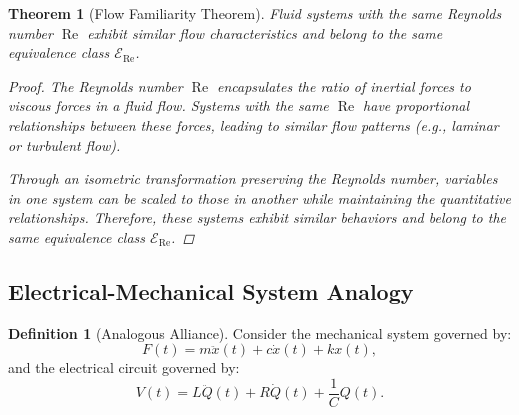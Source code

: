 \documentclass{article}
\newtheorem{theorem}{Theorem}[section]
\theoremstyle{definition}
\newtheorem{definition}{Definition}[section]
\theoremstyle{remark}
\begin{document}
	\begin{theorem}[Flow Familiarity Theorem]
		Fluid systems with the same Reynolds number $\operatorname{Re}$ exhibit similar flow characteristics and belong to the same equivalence class $\mathcal{E}_{\operatorname{Re}}$.
		
		\begin{proof}
			The Reynolds number $\operatorname{Re}$ encapsulates the ratio of inertial forces to viscous forces in a fluid flow. Systems with the same $\operatorname{Re}$ have proportional relationships between these forces, leading to similar flow patterns (e.g., laminar or turbulent flow).
			
			Through an isometric transformation preserving the Reynolds number, variables in one system can be scaled to those in another while maintaining the quantitative relationships. Therefore, these systems exhibit similar behaviors and belong to the same equivalence class $\mathcal{E}_{\operatorname{Re}}$.
		\end{proof}
	\end{theorem}
	
	\subsection{Electrical-Mechanical System Analogy}
	
	\begin{definition}[Analogous Alliance]
		Consider the mechanical system governed by:
		\[
		F(t) = m \ddot{x}(t) + c \dot{x}(t) + k x(t),
		\]
		and the electrical circuit governed by:
		\[
		V(t) = L \ddot{Q}(t) + R \dot{Q}(t) + \dfrac{1}{C} Q(t).
		\]
	\end{definition}
	
\end{document}
